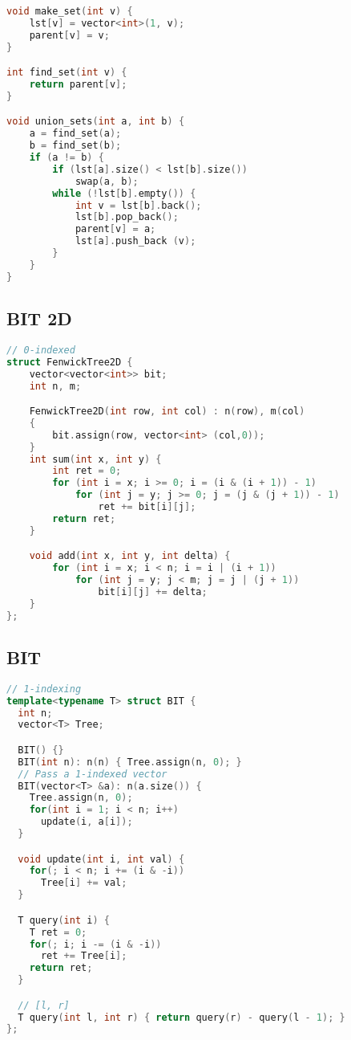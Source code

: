 \documentclass[10pt,a4paper,landscape]{article}
\begin{document}
\begin{multicols}{3}
\begin{lstlisting}[language=C++,breaklines=true]
void make_set(int v) {
    lst[v] = vector<int>(1, v);
    parent[v] = v;
}

int find_set(int v) {
    return parent[v];
}

void union_sets(int a, int b) {
    a = find_set(a);
    b = find_set(b);
    if (a != b) {
        if (lst[a].size() < lst[b].size())
            swap(a, b);
        while (!lst[b].empty()) {
            int v = lst[b].back();
            lst[b].pop_back();
            parent[v] = a;
            lst[a].push_back (v);
        }
    }
}
\end{lstlisting}

\subsection{BIT 2D}
\begin{lstlisting}[language=C++, breaklines=true]
// 0-indexed
struct FenwickTree2D {
    vector<vector<int>> bit;
    int n, m;

    FenwickTree2D(int row, int col) : n(row), m(col)
    {
        bit.assign(row, vector<int> (col,0));
    }
    int sum(int x, int y) {
        int ret = 0;
        for (int i = x; i >= 0; i = (i & (i + 1)) - 1)
            for (int j = y; j >= 0; j = (j & (j + 1)) - 1)
                ret += bit[i][j];
        return ret;
    }

    void add(int x, int y, int delta) {
        for (int i = x; i < n; i = i | (i + 1))
            for (int j = y; j < m; j = j | (j + 1))
                bit[i][j] += delta;
    }
};
\end{lstlisting}

\subsection{BIT}
\begin{lstlisting}[language=C++, breaklines=true]
// 1-indexing
template<typename T> struct BIT {
  int n;
  vector<T> Tree;

  BIT() {}
  BIT(int n): n(n) { Tree.assign(n, 0); }
  // Pass a 1-indexed vector
  BIT(vector<T> &a): n(a.size()) {
    Tree.assign(n, 0);
    for(int i = 1; i < n; i++)
      update(i, a[i]);
  }

  void update(int i, int val) {
    for(; i < n; i += (i & -i))
      Tree[i] += val;
  }

  T query(int i) {
    T ret = 0;
    for(; i; i -= (i & -i))
      ret += Tree[i];
    return ret;
  }

  // [l, r]
  T query(int l, int r) { return query(r) - query(l - 1); }
};
\end{lstlisting}


\end{multicols}
\end{document}
